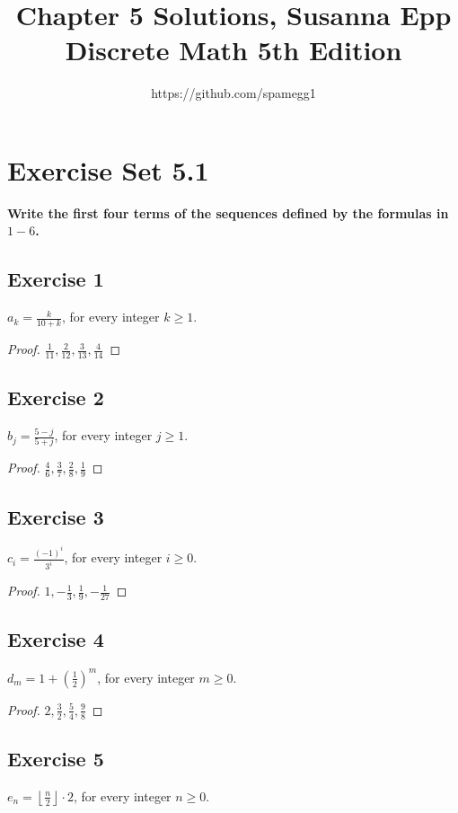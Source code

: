 \documentclass[14pt]{extarticle}
\title{Chapter 5 Solutions, Susanna Epp Discrete Math 5th Edition}
\author{https://github.com/spamegg1}
\newcommand{\dps}{\displaystyle}
\newcommand{\floor}[1]{{\left\lfloor#1\right\rfloor}}
\newcommand{\cy}{\color{cyan}}
\begin{document}
\maketitle
\tableofcontents

\section{Exercise Set 5.1}

 {\bf \cy Write the first four terms of the sequences defined by the formulas in $1-6$.}

\subsection{Exercise 1}
$\dps a_k  = \frac{k}{10 + k}$, for every integer $k \geq 1$.

\begin{proof}
    $\dps\frac{1}{11}, \frac{2}{12}, \frac{3}{13}, \frac{4}{14}$
\end{proof}

\subsection{Exercise 2}
$\dps b_j  = \frac{5-j}{5+j}$, for every integer $j \geq 1$.

\begin{proof}
    $\dps\frac{4}{6}, \frac{3}{7}, \frac{2}{8}, \frac{1}{9}$
\end{proof}

\subsection{Exercise 3}
$\dps c_i  = \frac{(-1)^i}{3^i}$, for every integer $i \geq 0$.

\begin{proof}
    $\dps 1, -\frac{1}{3}, \frac{1}{9}, -\frac{1}{27}$
\end{proof}

\subsection{Exercise 4}
$\dps d_m  = 1 + \left(\frac{1}{2}\right)^m$, for every integer $m \geq 0$.

\begin{proof}
    $\dps 2, \frac{3}{2}, \frac{5}{4}, \frac{9}{8}$
\end{proof}

\subsection{Exercise 5}
$\dps e_n  = \floor{\frac{n}{2}}\cdot 2$, for every integer $n \geq 0$.
\end{document}
